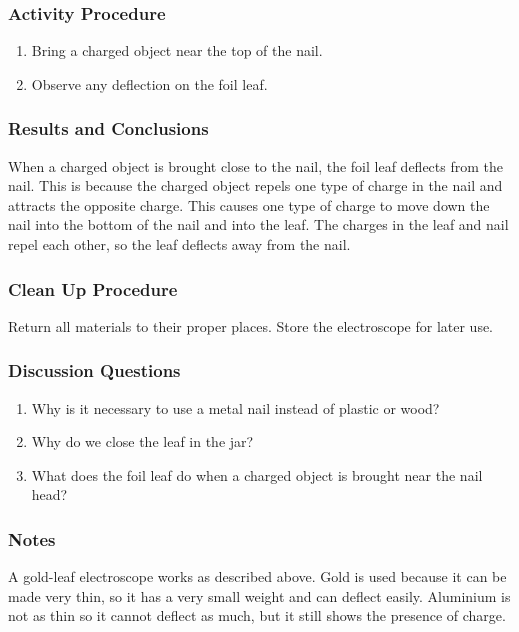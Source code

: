 \subsubsection*{Activity Procedure}
\begin{enumerate}
\item{Bring a charged object near the top of the nail.} 
\item{Observe any deflection on the foil leaf.} 
\end{enumerate}

\subsubsection*{Results and Conclusions}
When a charged object is brought close to the nail, the foil leaf deflects from the nail. This is because the charged object repels one type of charge in the nail and attracts the opposite charge. This causes one type of charge to move down the nail into the bottom of the nail and into the leaf. The charges in the leaf and nail repel each other, so the leaf deflects away from the nail. 

\subsubsection*{Clean Up Procedure}
Return all materials to their proper places. Store the electroscope for later use.

\subsubsection*{Discussion Questions}
\begin{enumerate}
\item{Why is it necessary to use a metal nail instead of plastic or wood?}
\item{Why do we close the leaf in the jar?}
\item{What does the foil leaf do when a charged object is brought near the nail head?}
\end{enumerate}

\subsubsection*{Notes}
A gold-leaf electroscope works as described above. Gold is used because it can be made very thin, so it has a very small weight and can deflect easily. Aluminium is not as thin so it cannot deflect as much, but it still shows the presence of charge. 

